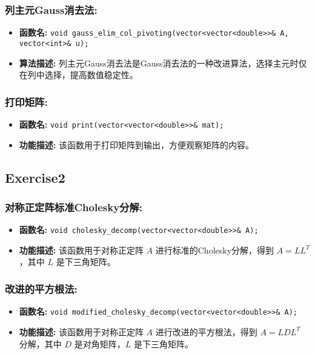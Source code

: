 \documentclass{article}
\begin{document}
\subsubsection*{列主元Gauss消去法:}
\begin{itemize}
	\item \textbf{函数名:} \texttt{void gauss\_elim\_col\_pivoting(vector<vector<double>>\& A, vector<int>\& u);}
	\item \textbf{算法描述:} 列主元Gauss消去法是Gauss消去法的一种改进算法，选择主元时仅在列中选择，提高数值稳定性。
\end{itemize}

\subsubsection*{打印矩阵:}
\begin{itemize}
	\item \textbf{函数名:} \texttt{void print(vector<vector<double>>\& mat);}
	\item \textbf{功能描述:} 该函数用于打印矩阵到输出，方便观察矩阵的内容。
\end{itemize}

\subsection*{Exercise2}

\subsubsection*{对称正定阵标准Cholesky分解:}
\begin{itemize}
	\item \textbf{函数名:} \texttt{void cholesky\_decomp(vector<vector<double>>\& A);}
	\item \textbf{功能描述:} 该函数用于对称正定阵 \(A\) 进行标准的Cholesky分解，得到 \(A = LL^T\)，其中 \(L\) 是下三角矩阵。
\end{itemize}

\subsubsection*{改进的平方根法:}
\begin{itemize}
	\item \textbf{函数名:} \texttt{void modified\_cholesky\_decomp(vector<vector<double>>\& A);}
	\item \textbf{功能描述:} 该函数用于对称正定阵 \(A\) 进行改进的平方根法，得到 \(A = LDL^T\) 分解，其中 \(D\) 是对角矩阵，\(L\) 是下三角矩阵。
\end{itemize}
\end{document}
